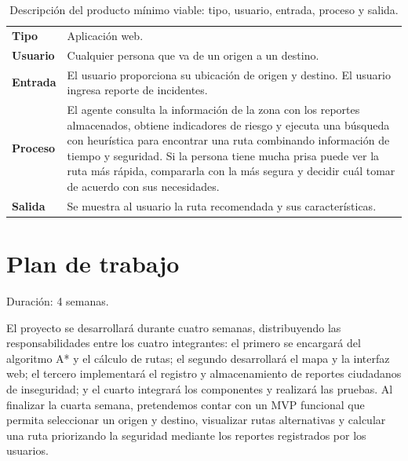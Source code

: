 \documentclass[11pt]{article}
\begin{document}
\begin{table}[H]
  \caption{Descripción del producto mínimo viable: tipo, usuario, entrada, proceso y salida.}
  \label{tab:mvp}
  \renewcommand{\arraystretch}{1.3}
  \begin{tabularx}{\textwidth}{@{}>{\bfseries}p{}X@{}}
    \toprule
    Tipo & Aplicación web. \\
    Usuario & Cualquier persona que va de un origen a un destino. \\
    Entrada & El usuario proporciona su ubicación de origen y destino. El usuario ingresa reporte
              de incidentes. \\
    Proceso & El agente consulta la información de la zona con los reportes almacenados, obtiene
              indicadores de riesgo y ejecuta una búsqueda con heurística para encontrar una ruta
              combinando información de tiempo y seguridad. Si la persona tiene mucha prisa puede
              ver la ruta más rápida, compararla con la más segura y decidir cuál tomar de acuerdo
              con sus necesidades. \\
    Salida & Se muestra al usuario la ruta recomendada y sus características. \\
    \bottomrule
  \end{tabularx}
\end{table}

\section{Plan de trabajo}
\label{sec:plan}

Duración: 4 semanas.

El proyecto se desarrollará durante cuatro semanas, distribuyendo las responsabilidades entre los
cuatro integrantes: el primero se encargará del algoritmo A* y el cálculo de rutas; el segundo
desarrollará el mapa y la interfaz web; el tercero implementará el registro y almacenamiento de
reportes ciudadanos de inseguridad; y el cuarto integrará los componentes y realizará las pruebas.
Al finalizar la cuarta semana, pretendemos contar con un MVP funcional que permita seleccionar un
origen y destino, visualizar rutas alternativas y calcular una ruta priorizando la seguridad
mediante los reportes registrados por los usuarios.
\end{document}
